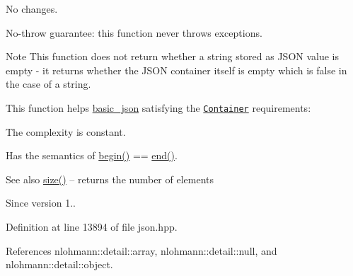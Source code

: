 No changes.

No-\/throw guarantee\+: this function never throws exceptions.

\begin{DoxyNote}{Note}
This function does not return whether a string stored as J\+S\+ON value is empty -\/ it returns whether the J\+S\+ON container itself is empty which is false in the case of a string.
\end{DoxyNote}
This function helps {\ttfamily \hyperlink{classnlohmann_1_1basic__json}{basic\+\_\+json}} satisfying the \href{http://en.cppreference.com/w/cpp/concept/Container}{\tt Container} requirements\+:
\begin{DoxyItemize}
\item The complexity is constant.
\item Has the semantics of {\ttfamily \hyperlink{classnlohmann_1_1basic__json_a0ff28dac23f2bdecee9564d07f51dcdc}{begin()} == \hyperlink{classnlohmann_1_1basic__json_a13e032a02a7fd8a93fdddc2fcbc4763c}{end()}}.
\end{DoxyItemize}

\begin{DoxySeeAlso}{See also}
\hyperlink{classnlohmann_1_1basic__json_a25e27ad0c6d53c01871c5485e1f75b96}{size()} -- returns the number of elements
\end{DoxySeeAlso}
\begin{DoxySince}{Since}
version 1.. 
\end{DoxySince}


Definition at line 13894 of file json.\+hpp.



References nlohmann\+::detail\+::array, nlohmann\+::detail\+::null, and nlohmann\+::detail\+::object.


